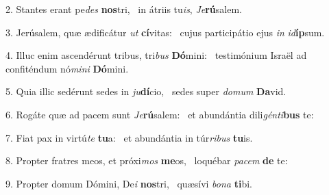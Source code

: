 2. Stantes erant pe\textit{des} \textbf{nos}tri, \ast\  in átriis tu\textit{is}, \textit{Je}\textbf{rú}salem.\

3. Jerúsalem, quæ ædificátur \textit{ut} \textbf{cí}vitas: \ast\  cujus participátio ejus \textit{in} \textit{id}\textbf{íp}sum.\

4. Illuc enim ascendérunt tribus, tri\textit{bus} \textbf{Dó}mini: \ast\  testimónium Israël ad confiténdum nó\textit{mi}\textit{ni} \textbf{Dó}mini.\

5. Quia illic sedérunt sedes in \textit{ju}\textbf{dí}cio, \ast\  sedes super \textit{do}\textit{mum} \textbf{Da}vid.\

6. Rogáte quæ ad pacem sunt \textit{Je}\textbf{rú}salem: \ast\  et abundántia dili\textit{gén}\textit{ti}\textbf{bus} te:\

7. Fiat pax in virtú\textit{te} \textbf{tu}a: \ast\  et abundántia in túr\textit{ri}\textit{bus} \textbf{tu}is.\

8. Propter fratres meos, et próxi\textit{mos} \textbf{me}os, \ast\  loquébar \textit{pa}\textit{cem} \textbf{de} te:\

9. Propter domum Dómini, De\textit{i} \textbf{nos}tri, \ast\  quæsívi \textit{bo}\textit{na} \textbf{ti}bi.\

